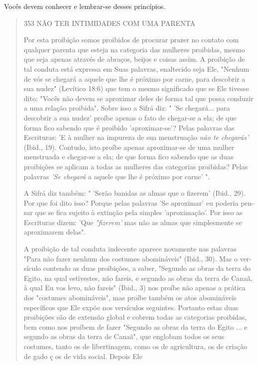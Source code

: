 Vocês devem conhecer e lembrar-se desses princípios.

\begin{quote}
353 NÃO TER INTIMIDADES COM UMA PARENTA

Por esta proibição somos proibidos de procurar prazer no contato com
qualquer parenta que esteja na categoria das mulheres proibidas, mesmo
que seja apenas através de abraços, beijos e coisas assim. A proibição
de tal con­duta está expressa em Suas palavras, enaltecido seja Ele,
"Nenhum de vós se chegará a aquele que lhe é próximo por carne, para
descobrir a sua nudez" (Le­vítico 18:6) que tem o mesmo significado que
se Ele tivesse dito: "Vocês não devem se aproximar deles de forma tal
que possa conduzir a uma relação proi­bida". Sobre isso a Sifrá diz: "
'Se chegará... para descobrir a sua nudez' proíbe apenas o fato de
chegar-se a ela; de que forma fico sabendo que é proibido
'aproximar-se'? Pelas palavras das Escrituras: 'E à mulher na impureza
de sua menstruação \emph{não te chegarás'} (Ibid., 19). Contudo,
isto.proíbe apenas aproximar-se de uma mulher menstruada e chegar-se a
ela; de que forma fico sabendo que as duas proibições se aplicam a todas
as mulheres das categorias proibidas? Pe­las palavras \emph{'Se chegará}
a aquele que lhe é próximo por carne' ".

A Sifrá diz também: " 'Serão banidas as almas que o fizerem' (Ibid.,
29). Por que foi dito isso? Porque pelas palavras 'Se aproximar' eu
poderia pen­sar que se fica sujeito à extinção pela simples
'aproximação'. Por isso as Escri­turas dizem: 'Que \emph{°fizerem'} mas
não as almas que simplesmente se aproxima­rem delas".

A proibição de tal conduta indecente aparece novamente nas pala­vras
"Para não fazer nenhum dos costumes abomináveis" (Ibid., 30). Mas o
ver­sículo contendo as duas proibições, a saber, "Segundo as obras da
terra do Egi­to, na qual estivestes, não fareis, e segundo as obras da
terra de Canaã, à qual Eu vos levo, não fareis" (Ibid., 3) nos proíbe
não apenas a prática dos "costu­mes abomináveis", mas proíbe também os
atos abomináveis específicos que Ele expõe nos versículos seguintes.
Portanto estas duas proibições são de ex­tensão global e cobrem todas as
categorias proibidas, bem como nos proíbem de fazer "Segundo as obras da
terra do Egito ... e segundo as obras da terra de Canaã", que englobam
todos os seus costumes, tanto os de libertinagem, como os de
agricultura, os de criação de gado ç os de vida social. Depois Ele
\end{quote}

